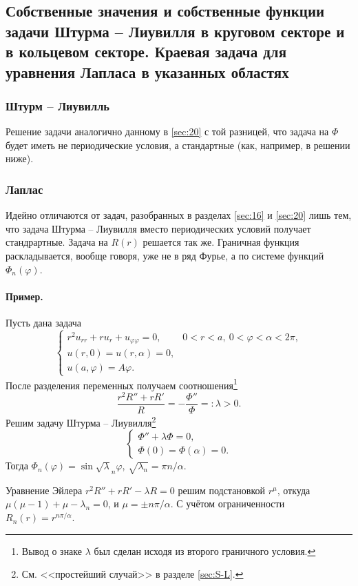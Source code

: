 \subsection{Собственные значения и собственные функции задачи Штурма -- Лиувилля в круговом секторе и в кольцевом секторе. Краевая задача для уравнения Лапласа в указанных областях}
\subsubsection{Штурм -- Лиувилль}
Решение задачи аналогично данному в \ref{sec:20} с той разницей, что задача на
$ \Phi $ будет иметь не периодические условия, а стандартные (как, например,
в решении ниже).

\subsubsection{Лаплас} Идейно отличаются от задач, разобранных в разделах \ref{sec:16} и \ref{sec:20}
лишь тем, что задача Штурма -- Лиувилля вместо периодических условий получает
стандрартные. Задача на $ R(r) $ решается так же. Граничная функция
раскладывается, вообще говоря, уже не в ряд Фурье, а по системе функций $
\Phi_n(\varphi) $.

\paragraph{Пример.} Пусть дана задача  
\label{sec:laplace_example}
\[
  \begin{cases}
    r^2u_{rr} + ru_r + u_{\varphi\varphi} = 0, & 0 < r < a, \ 0 < \varphi <
    \alpha < 2\pi,\\
    u(r, 0) = u(r, \alpha) = 0,\\
    u(a, \varphi) = A\varphi.
  \end{cases}
\]
После разделения переменных получаем соотношения\footnote{Вывод о знаке $\lambda
$ был сделан исходя из второго граничного условия.}
\[
    \frac{r^2 R'' + rR'}{R} =-\frac{\Phi''}{\Phi} =: \lambda > 0.
\]
 Решим
задачу Штурма -- Лиувилля\footnote{См. <<простейший случай>> в разделе
\ref{sec:S-L}.}
\[
  \begin{cases}
    \Phi'' + \lambda\Phi = 0,\\
    \Phi(0) = \Phi(\alpha) = 0.
  \end{cases}
\]
Тогда $ \Phi_n(\varphi) = \sin \sqrt\lambda_n\varphi $, $ \sqrt{\lambda_n} = \pi
n/\alpha$. 

Уравнение Эйлера $ r^2R'' + rR' - \lambda R = 0 $ решим подстановкой $ r^\mu $,
откуда $ \mu(\mu-1) + \mu - \lambda_n = 0 $, и $ \mu = \pm n\pi/\alpha $. С
учётом ограниченности $ R_n(r) = r^{n\pi/\alpha} $. 


